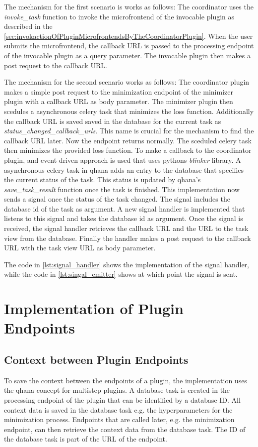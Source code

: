\documentclass[
  a4paper,  %
  twoside,  %
  bibliography=totoc,
  headsepline,
  cleardoublepage=empty,
  parskip=half,
  draft=false
]{scrbook}
\begin{document}
The mechanism for the first scenario is works as follows:
The coordinator uses the \emph{invoke\_task} function to invoke the microfrontend of the invocable plugin as described in the \ref{sec:invokactionOfPluginMicrofrontendsByTheCoordinatorPlugin}.
When the user submits the microfrontend, the callback URL is passed to the processing endpoint of the invocable plugin as a query parameter.
The invocable plugin then makes a post request to the callback URL.

The mechanism for the second scenario works as follows:
The coordinator plugin makes a simple post request to the minimization endpoint of the minimizer plugin with a callback URL as body parameter.
The minimizer plugin then scedules a asynchronous celery task that minimizes the loss function.
Additionally the callback URL is saved saved in the database for the current task as \emph{status\_changed\_callback\_urls}.
This name is crucial for the mechanism to find the callback URL later.
Now the endpoint returns normally.
The sceduled celery task then minimizes the provided loss function.
To make a callback to the coordinator plugin, and event driven approach is used that uses pythons \emph{blinker} library.
A asynchronous celery task in \gls{qhana} adds an entry to the database that specifies the current status of the task.
This status is updated by \gls{qhana}'s \emph{save\_task\_result} function once the task is finished.
This implementation now sends a signal once the status of the task changed.
The signal includes the database id of the task as argument.
A new signal handler is implemented that listens to this signal and takes the database id as argument.
Once the signal is received, the signal handler retrieves the callback URL and the URL to the task view from the database.
Finally the handler makes a post request to the callback URL with the task view URL as body parameter.

The code in \ref{lst:signal_handler} shows the implementation of the signal handler, while the code in \ref{lst:singal_emitter} shows at which point the signal is sent.

\section{Implementation of Plugin Endpoints}
\label{sec:implementationOfInteractionEndpoints}

\subsection{Context between Plugin Endpoints}
\label{sec:contextBetweenPluginEndpoints}
To save the context between the endpoints of a plugin, the implementation uses the \gls{qhana} concept for multistep plugins.
A database task is created in the processing endpoint of the plugin that can be identified by a database ID.
All context data is saved in the database task e.g. the hyperparameters for the minimization process.
Endpoints that are called later, e.g. the minimization endpoint, can then retrieve the context data from the database task.
The ID of the database task is part of the URL of the endpoint.
\end{document}
